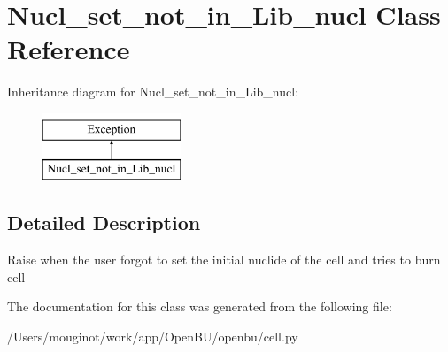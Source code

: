 \hypertarget{classopenbu_1_1cell_1_1_nucl__set__not__in___lib__nucl}{}\section{Nucl\+\_\+set\+\_\+not\+\_\+in\+\_\+\+Lib\+\_\+nucl Class Reference}
\label{classopenbu_1_1cell_1_1_nucl__set__not__in___lib__nucl}
Inheritance diagram for Nucl\+\_\+set\+\_\+not\+\_\+in\+\_\+\+Lib\+\_\+nucl\+:\begin{figure}[H]
\begin{center}
\leavevmode
\includegraphics[height=2.000000cm]{classopenbu_1_1cell_1_1_nucl__set__not__in___lib__nucl}
\end{center}
\end{figure}


\subsection{Detailed Description}
\begin{DoxyVerb}Raise when the user forgot to set the initial nuclide of the cell and tries to burn cell\end{DoxyVerb}
 

The documentation for this class was generated from the following file\+:\begin{DoxyCompactItemize}
\item 
/\+Users/mouginot/work/app/\+Open\+B\+U/openbu/cell.\+py\end{DoxyCompactItemize}
